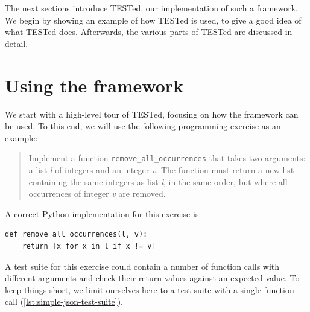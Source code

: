 \documentclass[../main]{subfiles}
\begin{document}
The next sections introduce TESTed, our implementation of such a framework.
We begin by showing an example of how TESTed is used, to give a good idea of what TESTed does.
Afterwards, the various parts of TESTed are discussed in detail.

\section{Using the framework}\label{sec:tested1-using-the-framework}

We start with a high-level tour of TESTed, focusing on how the framework can be used.
To this end, we will use the following programming exercise as an example:

\begin{quote}
    Implement a function \texttt{remove\_all\_occurrences} that takes two arguments: a list \textit{l} of integers and an integer \textit{v}.
    The function must return a new list containing the same integers as list \textit{l}, in the same order, but where all occurrences of integer \textit{v} are removed.
\end{quote}

A correct Python implementation for this exercise is:

\begin{verbatim}
def remove_all_occurrences(l, v):
    return [x for x in l if x != v]
\end{verbatim}

A test suite for this exercise could contain a number of function calls with different arguments and check their return values against an expected value.
To keep things short, we limit ourselves here to a test suite with a single function call (\cref{lst:simple-json-test-suite}).

\end{document}
